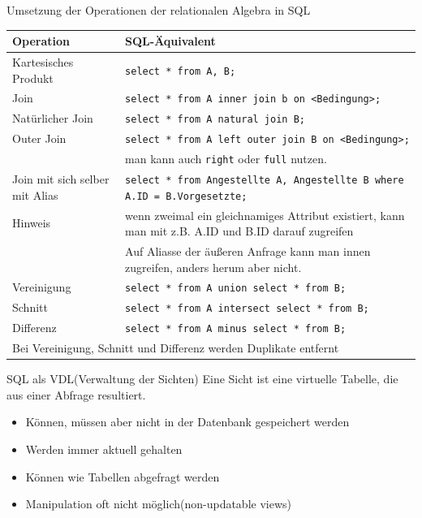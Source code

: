 \documentclass{article}
\begin{document}
\begin{block}{Umsetzung der Operationen der relationalen Algebra in SQL}
  \begin{center}
    \begin{tabular}{|p{4cm}|p{7cm}|}
      \hline
      \textbf{Operation} & \textbf{SQL-Äquivalent} \\
      \hline
      Kartesisches Produkt & \texttt{select * from A, B;} \\
      \hline
      Join & \texttt{select * from A inner join b on <Bedingung>;} \\
      \hline
      Natürlicher Join & \texttt{select * from A natural join B;} \\
      \hline
      Outer Join & \texttt{select * from A left outer join B on <Bedingung>;} \\
      & man kann auch \texttt{right} oder \texttt{full} nutzen. \\
      \hline
      Join mit sich selber mit Alias & \texttt{select * from Angestellte A, Angestellte B where A.ID = B.Vorgesetzte;} \\
      \hline
      Hinweis & wenn zweimal ein gleichnamiges Attribut existiert, kann man mit z.B. A.ID und B.ID darauf zugreifen \\
      & Auf Aliasse der äußeren Anfrage kann man innen zugreifen, anders herum aber nicht. \\
      \hline
      Vereinigung & \texttt{select * from A union select * from B;} \\
      \hline
      Schnitt & \texttt{select * from A intersect select * from B;} \\
      \hline
      Differenz & \texttt{select * from A minus select * from B;} \\
      \hline
      \multicolumn{2}{|p{11cm}|}{Bei Vereinigung, Schnitt und Differenz werden Duplikate entfernt} \\
      \hline
    \end{tabular}
  \end{center}
\end{block}

\begin{block}{SQL als VDL(Verwaltung der Sichten)}
  Eine Sicht ist eine virtuelle Tabelle, die aus einer Abfrage resultiert.
  \begin{itemize}
    \item Können, müssen aber nicht in der Datenbank gespeichert werden
    \item Werden immer aktuell gehalten
    \item Können wie Tabellen abgefragt werden
    \item Manipulation oft nicht möglich(non-updatable views)
  \end{itemize}
\end{block}
\end{document}
